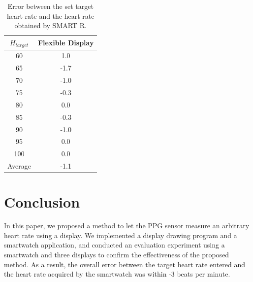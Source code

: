 \documentclass[sigchi,authordraft]{acmart}
\begin{document}
\begin{table}[!t]
  \centering
  \caption{Error between the set target heart rate and the heart rate obtained by SMART R.}
  \begin{tabular}{c|c} \hline\hline
    $H_{target}$ & Flexible Display \\ \hline
    60 & 1.0 \\
    65 & -1.7 \\
    70 & -1.0 \\
    75 & -0.3 \\
    80 & 0.0 \\
    85 & -0.3 \\
    90 & -1.0 \\
    95 & 0.0 \\
    100 & 0.0 \\ \hline
    Average & -1.1 \\ \hline
  \end{tabular}
  \label{tab:flexible_result}
\end{table}








\section{Conclusion}
\label{sec:conclusion}
In this paper, we proposed a method to let the PPG sensor measure an arbitrary heart rate using a display. We implemented a display drawing program and a smartwatch application, and conducted an evaluation experiment using a smartwatch and three displays to confirm the effectiveness of the proposed method. As a result, the overall error between the target heart rate entered and the heart rate acquired by the smartwatch was within -3 beats per minute.
\par
\end{document}
